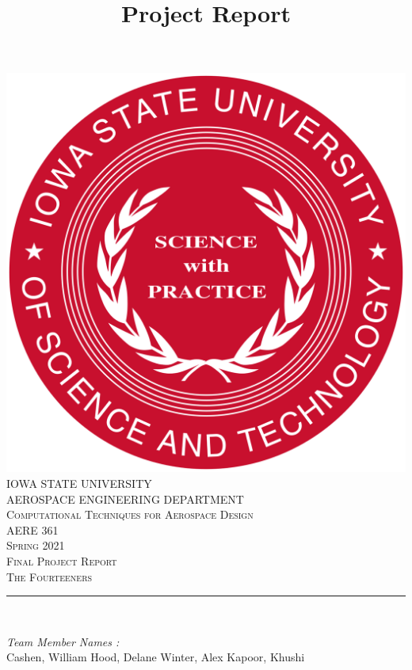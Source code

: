 \documentclass[12pt]{article}
\begin{document}
\title{Project Report}

\begin{titlepage}
\centering
    \vspace*{0.5 cm}
    \includegraphics[scale = 0.11]{isu_seal.png}\\[1.0 cm] %
    \textsc{\LARGE IOWA STATE UNIVERSITY}\\[2.0 cm]
    \textsc{\large AEROSPACE ENGINEERING DEPARTMENT}\\[0.2 cm]
    \textsc{\large Computational Techniques for Aerospace Design}\\[0.2 cm]
\textsc{\Large AERE 361}\\[0.5 cm] %
\textsc{\Large Spring 2021}\\[0.5 cm] %
\textsc{\Large Final Project Report}\\[0.2 cm]
\textsc{\Large The Fourteeners}\\[0.2 cm]
\rule{\linewidth}{0.2 mm} \\[0.4 cm]


\begin{minipage}{0.8\textwidth}

\begin{flushleft}
\emph{Team Member Names :} \\
Cashen, William\linebreak
Hood, Delane\linebreak
Winter, Alex\linebreak
Kapoor, Khushi\linebreak
\end{flushleft}
\end{minipage}\\[2 cm]

\vfill

\end{titlepage}
\end{document}
